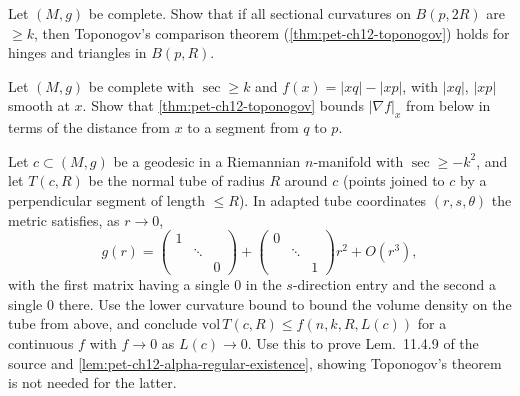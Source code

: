 \begin{remark}
  \label{rem:pet-ch12-ex-12-8-5}
  Let $(M,g)$ be complete. Show that if all sectional curvatures on $B(p,2R)$
  are $\ge k$, then Toponogov's comparison theorem
  (\cref{thm:pet-ch12-toponogov}) holds for hinges and triangles in $B(p,R)$.
\end{remark}

\begin{remark}
  \label{rem:pet-ch12-ex-12-8-6}
  Let $(M,g)$ be complete with $\sec\ge k$ and $f(x)=|xq|-|xp|$, with $|xq|$,
  $|xp|$ smooth at $x$. Show that \cref{thm:pet-ch12-toponogov} bounds
  $|\nabla f|_x$ from below in terms of the distance from $x$ to a segment from
  $q$ to $p$.
\end{remark}

\begin{remark}
  \label{rem:pet-ch12-ex-12-8-7}
  Let $c\subset(M,g)$ be a geodesic in a Riemannian $n$-manifold with
  $\sec\ge-k^2$, and let $T(c,R)$ be the normal tube of radius $R$ around $c$
  (points joined to $c$ by a perpendicular segment of length $\le R$). In
  adapted tube coordinates $(r,s,\theta)$ the metric satisfies, as $r\to0$,
  \[
    g(r)=\begin{pmatrix}1&&\\&\ddots&\\&&0\end{pmatrix}
    +\begin{pmatrix}0&&\\&\ddots&\\&&1\end{pmatrix}r^2+O(r^3),
  \]
  with the first matrix having a single $0$ in the $s$-direction entry and the
  second a single $0$ there. Use the lower curvature bound to bound the volume
  density on the tube from above, and conclude
  $\mathrm{vol}\,T(c,R)\le f(n,k,R,L(c))$ for a continuous $f$ with
  $f\to0$ as $L(c)\to0$. Use this to prove Lem.\ 11.4.9 of the source and
  \cref{lem:pet-ch12-alpha-regular-existence}, showing Toponogov's theorem is
  not needed for the latter.
\end{remark}

